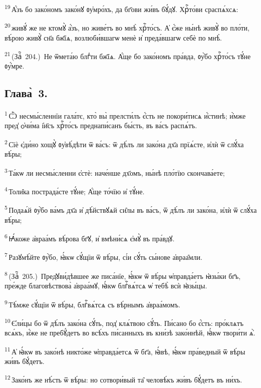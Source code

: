 \textsuperscript{19}\,А҆́зъ бо зако́номъ зако́нꙋ ᲂу҆мро́хъ, да бг҃ови жи́въ бꙋ́дꙋ. Хрⷭ҇то́ви сраспѧ́хсѧ:

\textsuperscript{20}\,живꙋ́ же не ктомꙋ̀ а҆́зъ, но живе́тъ во мнѣ̀ хрⷭ҇то́съ. А҆ є҆́же ны́нѣ живꙋ̀ во пло́ти, вѣ́рою живꙋ̀ сн҃а бж҃їѧ, возлюби́вшагѡ менѐ и҆ преда́вшагѡ себѐ по мнѣ̀.

\textsuperscript{21}\,(Заⷱ҇~204.)~Не ѿмета́ю блгⷣти бж҃їѧ. А҆́ще бо зако́номъ пра́вда, ᲂу҆̀бо хрⷭ҇то́съ тꙋ́не ᲂу҆́мре.

\subsection{Глава̀~3.}

\textsuperscript{1}\,Ѽ несмы́сленнїи гала́тє, кто̀ вы̀ прелсти́лъ є҆́сть не покори́тисѧ и҆́стинѣ; и҆̀мже пред̾ ѻ҆чи́ма і҆и҃съ хрⷭ҇то́съ преднапи́санъ бы́сть, въ ва́съ распѧ́тъ.

\textsuperscript{2}\,Сїѐ є҆ди́но хощꙋ̀ ᲂу҆вѣ́дѣти ѿ ва́съ: ѿ дѣ́лъ ли зако́на дх҃а прїѧ́сте, и҆лѝ ѿ слꙋ́ха вѣ́ры;

\textsuperscript{3}\,Та́кѡ ли несмы́сленни є҆стѐ: наче́нше дх҃омъ, ны́нѣ пло́тїю скончава́ете;

\textsuperscript{4}\,Толи̑ка пострада́сте тꙋ́не; А҆́ще то́чїю и҆ тꙋ́не.

\textsuperscript{5}\,Подаѧ́й ᲂу҆̀бо ва́мъ дх҃а и҆ дѣ́йствꙋѧй си̑лы въ ва́съ, ѿ дѣ́лъ ли зако́на, и҆лѝ ѿ слꙋ́ха вѣ́ры;

\textsuperscript{6}\,Ꙗ҆́коже а҆враа́мъ вѣ́рова бг҃ꙋ, и҆ вмѣни́сѧ є҆мꙋ̀ въ пра́вдꙋ.

\textsuperscript{7}\,Разꙋмѣ́йте ᲂу҆̀бо, ꙗ҆́кѡ сꙋ́щїи ѿ вѣ́ры, сі́и сꙋ́ть сы́нове а҆враа̑мли.

\textsuperscript{8}\,(Заⷱ҇~205.)~Пред̾ꙋви́дѣвшее же писа́нїе, ꙗ҆́кѡ ѿ вѣ́ры ѡ҆правда́етъ ꙗ҆зы́ки бг҃ъ, пре́жде благовѣствова̀ а҆враа́мꙋ, ꙗ҆́кѡ блгⷭ҇вѧ́тсѧ ѡ҆ тебѣ̀ всѝ ꙗ҆зы́цы.

\textsuperscript{9}\,Тѣ́мже сꙋ́щїи ѿ вѣ́ры, блгⷭ҇вѧ́тсѧ съ вѣ́рнымъ а҆враа́момъ.

\textsuperscript{10}\,Є҆ли́цы бо ѿ дѣ́лъ зако́на сꙋ́ть, под̾ клѧ́твою сꙋ́ть. Пи́сано бо є҆́сть: про́клѧтъ всѧ́къ, и҆́же не пребꙋ́детъ во всѣ́хъ пи́санныхъ въ кни́зѣ зако́ннѣй, ꙗ҆́кѡ твори́ти ѧ҆̀.

\textsuperscript{11}\,А҆ ꙗ҆́кѡ въ зако́нѣ никто́же ѡ҆правда́етсѧ ѿ бг҃а, ꙗ҆́вѣ, ꙗ҆́кѡ пра́ведный ѿ вѣ́ры жи́въ бꙋ́детъ.

\textsuperscript{12}\,Зако́нъ же нѣ́сть ѿ вѣ́ры: но сотвори́вый та̑ человѣ́къ жи́въ бꙋ́детъ въ ни́хъ.

